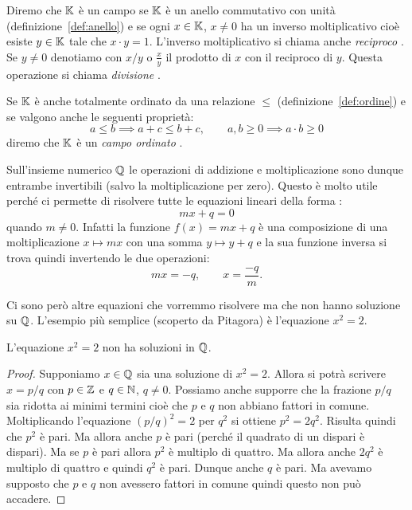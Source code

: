 \begin{definition}[campo]
  \label{def:campo}%
  Diremo che ${\mathbb K}$ è un campo se ${\mathbb K}$ è un anello commutativo con unità 
  (definizione~\ref{def:anello})
  e se ogni $x\in {\mathbb K}$, $x\neq 0$ ha un inverso moltiplicativo cioè 
  esiste $y\in {\mathbb K}$ tale che $x\cdot y = 1$.
  L'inverso moltiplicativo si chiama anche \emph{reciproco}%
%
.
  Se $y\neq 0$ denotiamo con $x/y$ o $\frac x y$ il prodotto 
  di $x$ con il reciproco di $y$. 
  Questa operazione si chiama \emph{divisione}%
%
.

  Se ${\mathbb K}$ è anche totalmente ordinato da una relazione $\le$
  (definizione~\ref{def:ordine})
  e se valgono anche le seguenti proprietà:
  \[
  a \le b \implies a+c\le b+c, \qquad 
  a,b\ge 0 \implies a\cdot b \ge 0
  \]
  diremo che ${\mathbb K}$ è un \emph{campo ordinato}%
%
.
\end{definition}

Sull'insieme numerico ${\mathbb Q}$ le operazioni di addizione e moltiplicazione 
sono dunque entrambe invertibili (salvo la moltiplicazione per zero). 
Questo è molto utile perché ci permette di risolvere tutte le equazioni lineari
della forma :
\[
  mx + q = 0  
\]
quando $m\neq 0$. Infatti la funzione $f(x) = mx+q$ è una composizione 
di una moltiplicazione $x\mapsto mx$ con una somma $y\mapsto y+q$ e la sua funzione
inversa si trova quindi invertendo le due operazioni: 
\[
  mx = -q, \qquad x = \frac{-q}{m}.  
\]

Ci sono però altre equazioni che vorremmo risolvere ma che non hanno soluzione su 
${\mathbb Q}$. 
L'esempio più semplice (scoperto da Pitagora) è l'equazione $x^2=2$.
%
\begin{theorem}
  \mymark{**}%
  \label{th:pitagora}%
  L'equazione $x^2=2$ non ha soluzioni in ${\mathbb Q}$.
  \end{theorem}
  \begin{proof}
  \mymark{*}%
  Supponiamo $x\in {\mathbb Q}$ sia una soluzione di $x^2=2$.
  Allora si potrà scrivere $x=p/q$ con $p\in {\mathbb Z}$ e $q\in {\mathbb N}$, $q\neq 0$.
  Possiamo anche supporre che la frazione $p/q$ sia ridotta ai minimi
  termini cioè che $p$ e $q$ non abbiano fattori in comune.
  Moltiplicando l'equazione
  $(p/q)^2=2$ per $q^2$ si ottiene $p^2 = 2 q^2$.
  Risulta quindi che $p^2$ è pari.
  Ma allora anche $p$ è pari (perché il quadrato di un dispari è dispari).
  Ma se $p$ è pari allora $p^2$ è multiplo di quattro.
  Ma allora anche $2q^2$ è multiplo di quattro e quindi $q^2$ è pari.
  Dunque anche $q$ è pari. Ma avevamo supposto che $p$ e $q$ non avessero
  fattori in comune quindi questo non può accadere.
\end{proof}

